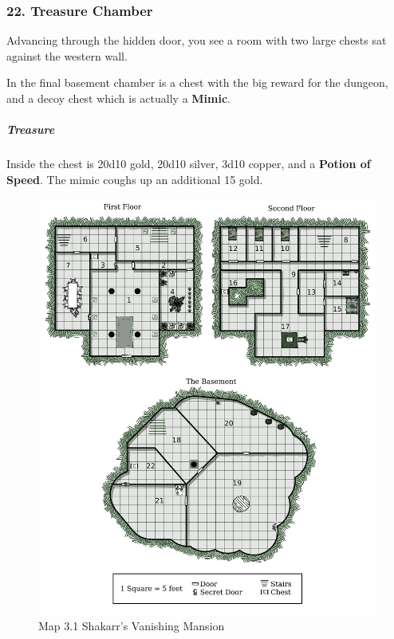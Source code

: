 \subsubsection{22. Treasure Chamber}
\begin{DndReadAloud}
  Advancing through the hidden door, you see a room with two large chests sat against the western wall.
\end{DndReadAloud}
In the final basement chamber is a chest with the big reward for the dungeon, and a decoy chest which is actually a \textbf{Mimic}.
\subparagraph{Treasure}
Inside the chest is 20d10 gold, 20d10 silver, 3d10 copper, and a \textbf{Potion of Speed}. The mimic coughs up an additional 15 gold.
\begin{figure}
  \includegraphics[width=\textwidth,height=0.9\textheight]{img/maps/ShakarrsMansion_45x45.png}
  \caption{Map 3.1 Shakarr's Vanishing Mansion}
\end{figure}

